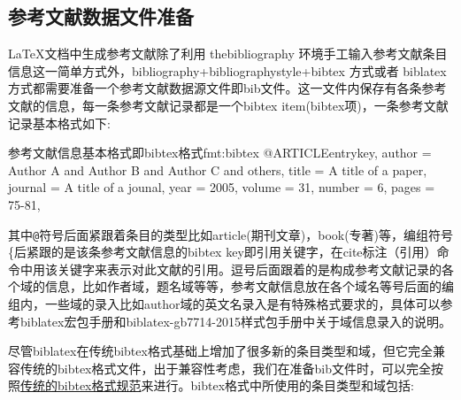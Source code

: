 \documentclass[twoside]{article} %
\begin{document}
\subsection{参考文献数据文件准备}
\LaTeX 文档中生成参考文献除了利用 thebibliography 环境手工输入参考文献条目信息这一简单方式外，bibliography+bibliographystyle+bibtex 方式或者 biblatex方式都需要准备一个参考文献数据源文件即bib文件。这一文件内保存有各条参考文献的信息，每一条参考文献记录都是一个bibtex item(bibtex项)，一条参考文献记录基本格式如下:
\begin{codetex}{参考文献信息基本格式即bibtex格式}{fmt:bibtex}
@ARTICLE{entrykey,
  author =       {Author A and Author B and Author C and others},
  title =        {A title of a paper},
  journal =      {A title of a jounal},
  year =         {2005},
  volume =       {31},
  number =       {6},
  pages =        {75-81},
}
\end{codetex}

其中\verb|@|符号后面紧跟着条目的类型比如article(期刊文章)，book(专著)等，编组符号\{后紧跟的是该条参考文献信息的bibtex key即引用关键字，在cite标注（引用）命令中用该关键字来表示对此文献的引用。逗号后面跟着的是构成参考文献记录的各个域的信息，比如作者域，题名域等等，参考文献信息放在各个域名等号后面的编组内，一些域的录入比如author域的英文名录入是有特殊格式要求的，具体可以参考biblatex宏包手册和biblatex-gb7714-2015样式包手册\cite{胡振震2016}中关于域信息录入的说明。

尽管biblatex在传统bibtex格式基础上增加了很多新的条目类型和域，但它完全兼容传统的bibtex格式文件，出于兼容性考虑，我们在准备bib文件时，可以完全按照\href{https://en.wikipedia.org/wiki/BibTeX}{传统的bibtex格式规范}来进行。bibtex格式中所使用的条目类型和域包括:
\end{document}
